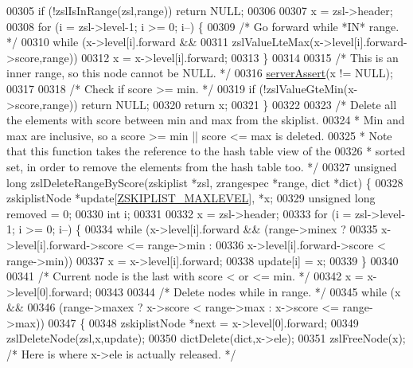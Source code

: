 \begin{DoxyCode}
00305     \textcolor{keywordflow}{if} (!zslIsInRange(zsl,range)) \textcolor{keywordflow}{return} NULL;
00306 
00307     x = zsl->header;
00308     \textcolor{keywordflow}{for} (i = zsl->level-1; i >= 0; i--) \{
00309         \textcolor{comment}{/* Go forward while *IN* range. */}
00310         \textcolor{keywordflow}{while} (x->level[i].forward &&
00311             zslValueLteMax(x->level[i].forward->score,range))
00312                 x = x->level[i].forward;
00313     \}
00314 
00315     \textcolor{comment}{/* This is an inner range, so this node cannot be NULL. */}
00316     \hyperlink{server_8h_a88114b5169b4c382df6b56506285e56a}{serverAssert}(x != NULL);
00317 
00318     \textcolor{comment}{/* Check if score >= min. */}
00319     \textcolor{keywordflow}{if} (!zslValueGteMin(x->score,range)) \textcolor{keywordflow}{return} NULL;
00320     \textcolor{keywordflow}{return} x;
00321 \}
00322 
00323 \textcolor{comment}{/* Delete all the elements with score between min and max from the skiplist.}
00324 \textcolor{comment}{ * Min and max are inclusive, so a score >= min || score <= max is deleted.}
00325 \textcolor{comment}{ * Note that this function takes the reference to the hash table view of the}
00326 \textcolor{comment}{ * sorted set, in order to remove the elements from the hash table too. */}
00327 \textcolor{keywordtype}{unsigned} \textcolor{keywordtype}{long} zslDeleteRangeByScore(zskiplist *zsl, zrangespec *range, dict *dict) \{
00328     zskiplistNode *update[\hyperlink{server_8h_a36822e3ce2740c64859068fd849e227b}{ZSKIPLIST\_MAXLEVEL}], *x;
00329     \textcolor{keywordtype}{unsigned} \textcolor{keywordtype}{long} removed = 0;
00330     \textcolor{keywordtype}{int} i;
00331 
00332     x = zsl->header;
00333     \textcolor{keywordflow}{for} (i = zsl->level-1; i >= 0; i--) \{
00334         \textcolor{keywordflow}{while} (x->level[i].forward && (range->minex ?
00335             x->level[i].forward->score <= range->min :
00336             x->level[i].forward->score < range->min))
00337                 x = x->level[i].forward;
00338         update[i] = x;
00339     \}
00340 
00341     \textcolor{comment}{/* Current node is the last with score < or <= min. */}
00342     x = x->level[0].forward;
00343 
00344     \textcolor{comment}{/* Delete nodes while in range. */}
00345     \textcolor{keywordflow}{while} (x &&
00346            (range->maxex ? x->score < range->max : x->score <= range->max))
00347     \{
00348         zskiplistNode *next = x->level[0].forward;
00349         zslDeleteNode(zsl,x,update);
00350         dictDelete(dict,x->ele);
00351         zslFreeNode(x); \textcolor{comment}{/* Here is where x->ele is actually released. */}

\end{DoxyCode}
